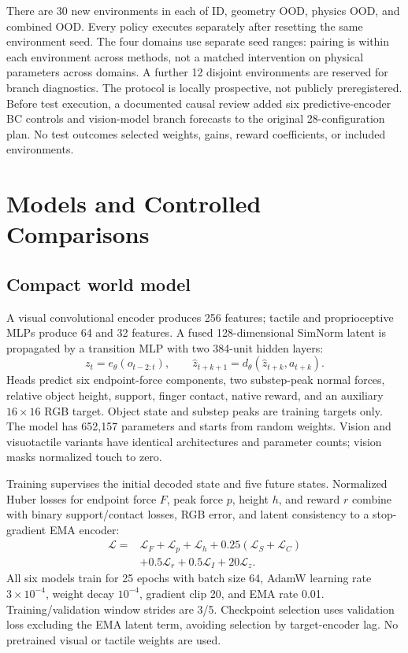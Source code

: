 \documentclass[letterpaper,10pt,conference]{ieeeconf}
\begin{document}
There are 30 new environments in each of ID, geometry OOD, physics OOD, and
combined OOD. Every policy executes separately after resetting the same
environment seed. The four domains use separate seed ranges: pairing is
within each environment across methods, not a matched intervention on
physical parameters across domains. A further 12 disjoint environments are
reserved for branch diagnostics. The protocol is locally prospective, not
publicly preregistered. Before test execution, a documented causal review
added six predictive-encoder BC controls and vision-model branch forecasts
to the original 28-configuration plan. No test outcomes selected weights,
gains, reward coefficients, or included environments.

\section{Models and Controlled Comparisons}
\subsection{Compact world model}
A visual convolutional encoder produces 256 features; tactile and
proprioceptive MLPs produce 64 and 32 features. A fused 128-dimensional
SimNorm latent is propagated by a transition MLP with two 384-unit hidden layers:
\begin{equation}
z_t=e_\theta(o_{t-2:t}),\qquad
\widehat z_{t+k+1}=d_\theta(\widehat z_{t+k},a_{t+k}).
\end{equation}
Heads predict six endpoint-force components, two substep-peak normal
forces, relative object height, support, finger contact, native reward,
and an auxiliary $16\times16$ RGB target. Object state and substep peaks
are training targets only. The model has 652,157 parameters and starts
from random weights. Vision and visuotactile variants have identical
architectures and parameter counts; vision masks normalized touch to zero.

Training supervises the initial decoded state and five future states.
Normalized Huber losses for endpoint force $F$, peak force $p$, height $h$,
and reward $r$ combine with binary support/contact losses, RGB error, and
latent consistency to a stop-gradient EMA encoder:
\begin{equation}
\begin{split}
\mathcal L={}&\mathcal L_F+\mathcal L_p+\mathcal L_h
+0.25(\mathcal L_S+\mathcal L_C)\\
&+0.5\mathcal L_r+0.5\mathcal L_I+20\mathcal L_z.
\end{split}
\end{equation}
All six models train for 25 epochs with batch size 64, AdamW learning rate
$3\times10^{-4}$, weight decay $10^{-4}$, gradient clip 20, and EMA rate
0.01. Training/validation window strides are 3/5. Checkpoint selection uses
validation loss excluding the EMA latent term, avoiding selection by
target-encoder lag. No pretrained visual or tactile weights are used.
\end{document}
